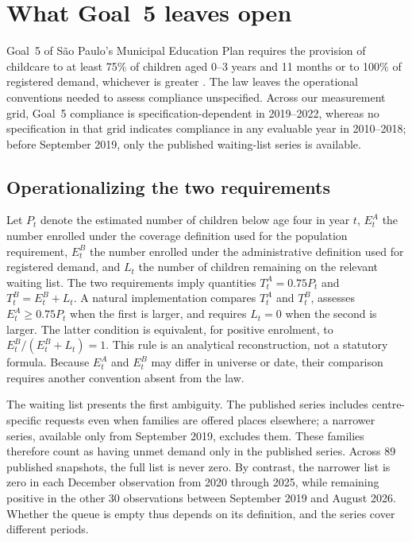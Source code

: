 
\section{What Goal~5 leaves open}\label{sec:goal}

Goal~5 of S\~ao Paulo's Municipal Education Plan requires the provision of childcare to at least 75\% of children aged 0--3 years and 11 months or to 100\% of registered demand, whichever is greater \citep{saopaulo2015pme}. The law leaves the operational conventions needed to assess compliance unspecified. Across our measurement grid, Goal~5 compliance is specification-dependent in 2019--2022, whereas no specification in that grid indicates compliance in any evaluable year in 2010--2018; before September 2019, only the published waiting-list series is available.

\subsection{Operationalizing the two requirements}

Let $P_t$ denote the estimated number of children below age four in year $t$, $E^A_t$ the number enrolled under the coverage definition used for the population requirement, $E^B_t$ the number enrolled under the administrative definition used for registered demand, and $L_t$ the number of children remaining on the relevant waiting list. The two requirements imply quantities $T^A_t=0.75P_t$ and $T^B_t=E^B_t+L_t$. A natural implementation compares $T^A_t$ and $T^B_t$, assesses $E^A_t\geq 0.75P_t$ when the first is larger, and requires $L_t=0$ when the second is larger. The latter condition is equivalent, for positive enrolment, to $E^B_t/(E^B_t+L_t)=1$. This rule is an analytical reconstruction, not a statutory formula. Because $E^A_t$ and $E^B_t$ may differ in universe or date, their comparison requires another convention absent from the law.

The waiting list presents the first ambiguity. The published series includes centre-specific requests even when families are offered places elsewhere; a narrower series, available only from September 2019, excludes them. These families therefore count as having unmet demand only in the published series. Across 89 published snapshots, the full list is never zero. By contrast, the narrower list is zero in each December observation from 2020 through 2025, while remaining positive in the other 30 observations between September 2019 and August 2026. Whether the queue is empty thus depends on its definition, and the series cover different periods.

